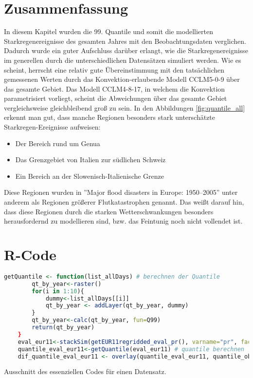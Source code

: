 \section{Zusammenfassung}
In diesem Kapitel wurden die 99. Quantile und somit die modellierten Starkregenereignisse des gesamten Jahres mit den Beobachtungsdaten verglichen. Dadurch wurde ein guter Aufschluss darüber erlangt, wie die Starkregenereignisse im generellen durch die unterschiedlichen Datensätzen simuliert werden. Wie es scheint, herrscht eine relativ gute Übereinstimmung mit den tatsächlichen gemessenen Werten durch das Konvektion-erlaubende Modell CCLM5-0-9 über das gesamte Gebiet. Das Modell CCLM4-8-17, in welchem die Konvektion parametrisiert vorliegt, scheint die Abweichungen über das gesamte Gebiet vergleichsweise gleichbleibend groß zu sein. In den Abbildungen \ref{fig:quantile_all} erkennt man gut, dass manche Regionen besonders stark unterschätzte Starkregen-Ereignisse aufweisen: 
\begin{itemize}
	\item Der Bereich rund um Genua
	\item Das Grenzgebiet von Italien zur südlichen Schweiz
	\item Ein Bereich an der Slowenisch-Italienische Grenze
\end{itemize}
Diese Regionen wurden in ''Major flood disasters in Europe: 1950–2005'' \cite{barredo_major_2007} unter anderem als Regionen größerer Flutkatastrophen genannt. Das weißt darauf hin, dass diese Regionen durch die starken Wetterschwankungen besonders herausfordernd zu modellieren sind, bzw. das Feintunig noch nicht vollendet ist.

\section{R-Code}
\begin{lstlisting}[language = R]
	getQuantile <- function(list_allDays) # berechnen der Quantile
		qt_by_year<-raster()
		for(i in 1:10){
			dummy<-list_allDays[[i]]
			qt_by_year <- addLayer(qt_by_year, dummy)
		}
		qt_by_year<-calc(qt_by_year, fun=Q99)
		return(qt_by_year)
	}
	eval_eur11<-stackSim(getEUR11regridded_eval_pr(), varname="pr", factor=3600*24)# Modelldaten in eine Liste geben
	quantile_eval_eur11<-getQuantile(eval_eur11) # quantile berechnen
	dif_quantile_eval_eur11 <- overlay(quantile_eval_eur11, quantile_observations, fun=function(x,y){return((x - y))})# differenzen Berechnen
\end{lstlisting}
Ausschnitt des essenziellen Codes für einen Datensatz.